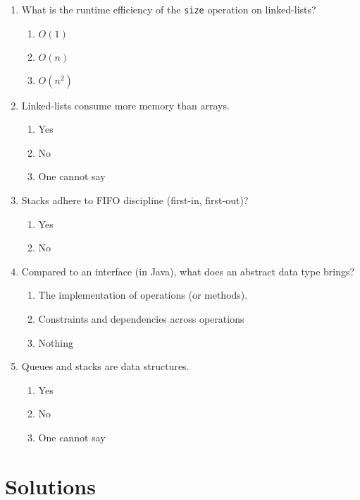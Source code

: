 \documentclass[11pt]{article}
\begin{document}
\begin{enumerate}
\item What is the runtime efficiency of the \texttt{size} operation on linked-lists?
\begin{enumerate}
\item \(O(1)\)
\item \(O(n)\)
\item \(O(n^2)\)
\end{enumerate}

\item Linked-lists consume more memory than arrays.
\begin{enumerate}
\item Yes
\item No
\item One cannot say
\end{enumerate}

\item Stacks adhere to FIFO discipline (first-in, first-out)?
\begin{enumerate}
\item Yes
\item No
\end{enumerate}

\item Compared to an interface (in Java), what does an abstract data type
brings?
\begin{enumerate}
\item The implementation of operations (or methods).
\item Constraints and dependencies across operations
\item Nothing
\end{enumerate}

\item Queues and stacks are data structures.
\begin{enumerate}
\item Yes
\item No
\item One cannot say
\end{enumerate}
\end{enumerate}


\section{Solutions}
\label{sec:orgfd992e7}
\end{document}
